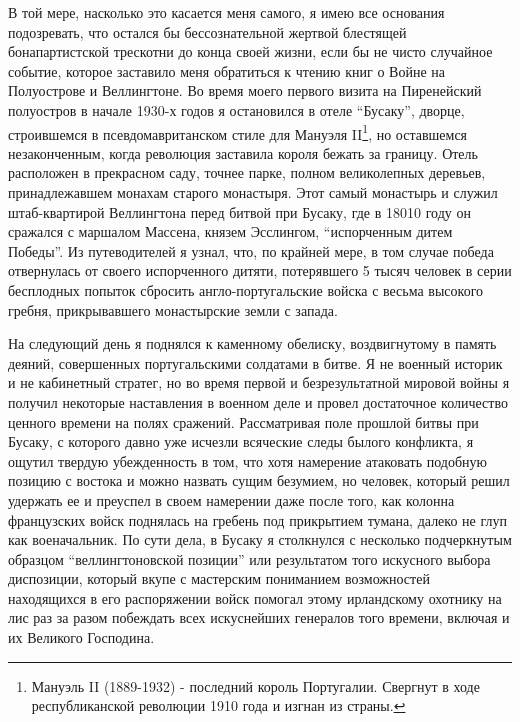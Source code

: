 \documentclass[
  oneside,
  12pt,
  titlepage]{book}
\begin{document}
В той мере, насколько это касается меня самого, я имею все основания подозревать, что остался бы бессознательной жертвой блестящей бонапартистской трескотни до конца своей жизни, если бы не чисто случайное событие, которое заставило меня обратиться к чтению книг о Войне на Полуострове и Веллингтоне. Во время моего первого визита на Пиренейский полуостров в начале 1930-х годов я остановился в отеле ``Бусаку'', дворце, строившемся в псевдомавританском стиле для Мануэля II\footnote{Мануэль II (1889-1932) - последний король Португалии. Свергнут в ходе республиканской революции 1910 года и изгнан из страны.}, но оставшемся незаконченным, когда революция заставила короля бежать за границу. Отель расположен в прекрасном саду, точнее парке, полном великолепных деревьев, принадлежавшем монахам старого монастыря. Этот самый монастырь и служил штаб-квартирой Веллингтона перед битвой при Бусаку, где в 18010 году он сражался с маршалом Массена, князем Эсслингом, ``испорченным дитем Победы''. Из путеводителей я узнал, что, по крайней мере, в том случае победа отвернулась от своего испорченного дитяти, потерявшего 5 тысяч человек в серии бесплодных попыток сбросить англо-португальские войска с весьма высокого гребня, прикрывавшего монастырские земли с запада.

На следующий день я поднялся к каменному обелиску, воздвигнутому в память деяний, совершенных португальскими солдатами в битве. Я не военный историк и не кабинетный стратег, но во время первой и безрезультатной мировой войны я получил некоторые наставления в военном деле и провел достаточное количество ценного времени на полях сражений. Рассматривая поле прошлой битвы при Бусаку, с которого давно уже исчезли всяческие следы былого конфликта, я ощутил твердую убежденность в том, что хотя намерение атаковать подобную позицию с востока и можно назвать сущим безумием, но человек, который решил удержать ее и преуспел в своем намерении даже после того, как колонна французских войск поднялась на гребень под прикрытием тумана, далеко не глуп как военачальник. По сути дела, в Бусаку я столкнулся с несколько подчеркнутым образцом ``веллингтоновской позиции'' или результатом того искусного выбора диспозиции, который вкупе с мастерским пониманием возможностей находящихся в его распоряжении войск помогал этому ирландскому охотнику на лис раз за разом побеждать всех искуснейших генералов того времени, включая и их Великого Господина.
\end{document}
